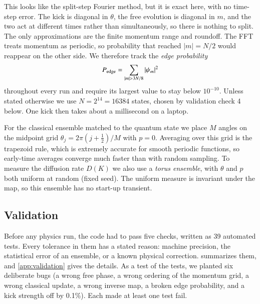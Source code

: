 This looks like the split-step Fourier method, but it is exact here, with no time-step error. The kick is
diagonal in $\theta$, the free evolution is diagonal in $m$, and the two act at different times rather than
simultaneously, so there is nothing to split. The only approximations are the finite momentum range and
roundoff. The FFT treats momentum as periodic, so probability that reached $|m| = N/2$ would reappear on
the other side. We therefore track the \emph{edge probability}
\begin{equation}
  P_{\rm edge} = \sum_{|m| > 3N/8} |\psi_m|^2
  \label{eq:edge}
\end{equation}
throughout every run and require its largest value to stay below $10^{-10}$. Unless stated otherwise we use
$N = 2^{14} = 16384$ states, chosen by validation check 4 below. One kick then takes about a millisecond on a
laptop.

For the classical ensemble matched to the quantum state we place $M$ angles on the midpoint grid
$\theta_j = 2\pi(j + \tfrac12)/M$ with $p = 0$. Averaging over this grid is the trapezoid rule, which is
extremely accurate for smooth periodic functions, so early-time averages converge much faster than with random
sampling. To measure the diffusion rate $D(K)$ we also use a \emph{torus ensemble}, with $\theta$ and $p$ both
uniform at random (fixed seed). The uniform measure is invariant under the map, so this ensemble has no
start-up transient.

\subsection{Validation}
\label{sec:validation}

Before any physics run, the code had to pass five checks, written as 39 automated tests. Every tolerance in
them has a stated reason: machine precision, the statistical error of an ensemble, or a known physical
correction.  summarizes them, and \cref{app:validation} gives the details. As a test of
the tests, we planted six deliberate bugs (a wrong free phase, a wrong ordering of the momentum grid, a wrong
classical update, a wrong inverse map, a broken edge probability, and a kick strength off by 0.1\%). Each made
at least one test fail.

